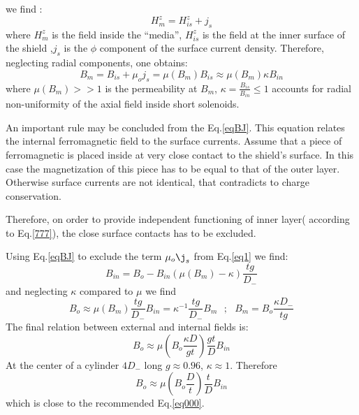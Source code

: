 \documentclass[12pt]{article}
\begin{document}
we find :  
\begin{equation}
H_m^z =H_{is}^z+j_s   
\label{eqBJ1}
\end{equation}
where $H_m^z$ is the field inside the ``media'', 
$H_{is}^z$ is the field at the 
inner surface of the shield ,$j_s$ is the $\phi$ component of the 
surface current density.
Therefore, neglecting   radial components, one obtains:
\newline
\begin{equation} 
B_m = B_{is}+\mu_o j_s=\mu(B_m) B_{is}\approx \mu(B_m)\kappa B_{in}  
\label{eqBJ}
\end{equation}
where $\mu(B_m)>>1$ is the permeability at $B_m$, 
$\kappa=\frac{B_{is}}{B_{in}}\leq1$ 
accounts for radial non-uniformity
 of the axial field inside  short solenoids.
 
An important rule  may  be concluded  from the  Eq.\ref{eqBJ}. 
This equation relates
the internal ferromagnetic field to the surface currents. Assume that  
a piece of ferromagnetic is placed  inside at   very close contact to the  shield's surface.
In this case  the magnetization of this piece  has to be  equal to that of  
the outer layer. Otherwise surface currents are not identical, that contradicts to charge  conservation.

Therefore, on order to provide independent functioning of inner layer( according to Eq.\ref{777}), the close  
surface contacts has to be excluded.

 
Using  Eq.\ref{eqBJ}  to exclude  the term $\mu_o \j_s$ from
Eq.\ref{eq1} we find:
%
\begin{equation}
B_{in}=B_o-B_{in}(\mu(B_m)-\kappa)\frac{tg}{D_-}
\label{eq11}
\end{equation}
%
and neglecting $\kappa$ compared to $\mu$ we find
%
\begin{equation}
B_{o}
\approx \mu(B_m)\frac{tg}{D_-} B_{in}
=\kappa^{-1}\frac{tg}{D_-}B_{m}~~~;~~~B_{m}=B_o\frac{\kappa D_-}{tg}
\label{eq12}
\end{equation}
%
The final relation between external and internal fields is:
%
\begin{equation}
B_o \approx \mu(B_o \frac{\kappa D}{gt}) \frac{gt}{D} B_{in}
\label{eq13}
\end{equation}
%
At the center of a cylinder  $4D_-$ long  
  $g\approx 0.96$,   $\kappa\approx 1$. Therefore
\begin{equation}
B_o \approx \mu(B_o \frac{D}{t}) \frac{t}{D} B_{in}
\label{eqfinal}
\end{equation}
which  is  close  to the recommended  Eq.\ref{eq000}.
\end{document}
